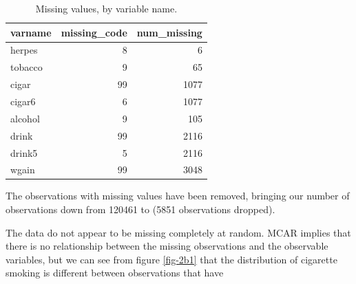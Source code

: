 \documentclass[12pt]{article}
\begin{document}
\begin{table}[ht]
\centering
\caption{Missing values, by variable name.} 
\begin{tabular}{lrr}
  \hline
varname & missing\_code & num\_missing \\ 
  \hline
herpes &   8 &   6 \\ 
  tobacco &   9 &  65 \\ 
  cigar &  99 & 1077 \\ 
  cigar6 &   6 & 1077 \\ 
  alcohol &   9 & 105 \\ 
  drink &  99 & 2116 \\ 
  drink5 &   5 & 2116 \\ 
  wgain &  99 & 3048 \\ 
   \hline
\end{tabular}
\end{table}

The observations with missing values have been removed, bringing our number of observations down from 120461 to  (5851 observations dropped).

\vem
{}

The data do not appear to be missing completely at random. MCAR implies that there is no relationship between the missing observations and the observable variables, but we can see from figure \ref{fig-2b1} that the distribution of cigarette smoking is different between observations that have 
\end{document}
